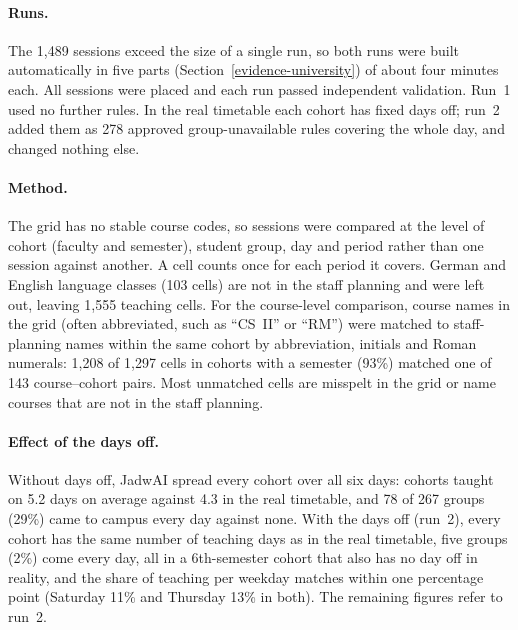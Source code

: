 \paragraph{Runs.} The 1{,}489 sessions exceed the size of a single run, so both runs were built automatically in five parts (Section~\ref{evidence-university}) of about four minutes each. All sessions were placed and each run passed independent validation. Run~1 used no further rules. In the real timetable each cohort has fixed days off; run~2 added them as 278 approved group-unavailable rules covering the whole day, and changed nothing else.

\paragraph{Method.} The grid has no stable course codes, so sessions were compared at the level of cohort (faculty and semester), student group, day and period rather than one session against another. A cell counts once for each period it covers. German and English language classes (103 cells) are not in the staff planning and were left out, leaving 1{,}555 teaching cells. For the course-level comparison, course names in the grid (often abbreviated, such as ``CS~II'' or ``RM'') were matched to staff-planning names within the same cohort by abbreviation, initials and Roman numerals: 1{,}208 of 1{,}297 cells in cohorts with a semester (93\%) matched one of 143 course--cohort pairs. Most unmatched cells are misspelt in the grid or name courses that are not in the staff planning.

\paragraph{Effect of the days off.} Without days off, JadwAI spread every cohort over all six days: cohorts taught on 5.2 days on average against 4.3 in the real timetable, and 78 of 267 groups (29\%) came to campus every day against none. With the days off (run~2), every cohort has the same number of teaching days as in the real timetable, five groups (2\%) come every day, all in a 6th-semester cohort that also has no day off in reality, and the share of teaching per weekday matches within one percentage point (Saturday 11\% and Thursday 13\% in both). The remaining figures refer to run~2.

